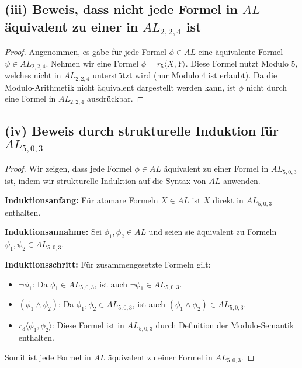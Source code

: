 \documentclass[12pt,a4paper]{article}
\begin{document}
\subsection*{(iii) Beweis, dass nicht jede Formel in $AL$ äquivalent zu einer in $AL_{2,2,4}$ ist}
\begin{proof}
Angenommen, es gäbe für jede Formel $\phi \in AL$ eine äquivalente Formel $\psi \in AL_{2,2,4}$. Nehmen wir eine Formel $\phi = r_5 \langle X, Y \rangle$. Diese Formel nutzt Modulo $5$, welches nicht in $AL_{2,2,4}$ unterstützt wird (nur Modulo $4$ ist erlaubt). Da die Modulo-Arithmetik nicht äquivalent dargestellt werden kann, ist $\phi$ nicht durch eine Formel in $AL_{2,2,4}$ ausdrückbar.
\end{proof}

\subsection*{(iv) Beweis durch strukturelle Induktion für $AL_{5,0,3}$}
\begin{proof}
Wir zeigen, dass jede Formel $\phi \in AL$ äquivalent zu einer Formel in $AL_{5,0,3}$ ist, indem wir strukturelle Induktion auf die Syntax von $AL$ anwenden.

\textbf{Induktionsanfang:} Für atomare Formeln $X \in AL$ ist $X$ direkt in $AL_{5,0,3}$ enthalten.

\textbf{Induktionsannahme:} Sei $\phi_1, \phi_2 \in AL$ und seien sie äquivalent zu Formeln $\psi_1, \psi_2 \in AL_{5,0,3}$.

\textbf{Induktionsschritt:} Für zusammengesetzte Formeln gilt:
\begin{itemize}
    \item $\neg \phi_1$: Da $\phi_1 \in AL_{5,0,3}$, ist auch $\neg \phi_1 \in AL_{5,0,3}$.
    \item $(\phi_1 \land \phi_2)$: Da $\phi_1, \phi_2 \in AL_{5,0,3}$, ist auch $(\phi_1 \land \phi_2) \in AL_{5,0,3}$.
    \item $r_3 \langle \phi_1, \phi_2 \rangle$: Diese Formel ist in $AL_{5,0,3}$ durch Definition der Modulo-Semantik enthalten.
\end{itemize}
Somit ist jede Formel in $AL$ äquivalent zu einer Formel in $AL_{5,0,3}$.
\end{proof}
\end{document}
